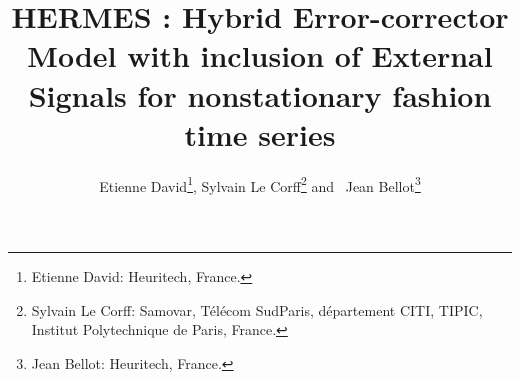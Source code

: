 \documentclass[lettersize,journal]{IEEEtran}
\begin{document}
%
\title{HERMES : Hybrid Error-corrector Model with inclusion of External Signals for nonstationary fashion time series}
%
%
%

\author{Etienne David\thanks{Etienne David: Heuritech, France.}, Sylvain Le Corff\thanks{Sylvain Le Corff:  Samovar, T\'el\'ecom SudParis, d\'epartement CITI, TIPIC, Institut Polytechnique de Paris, France.} and~ Jean Bellot\thanks{Jean Bellot: Heuritech, France.}}

%
%
\end{document}

